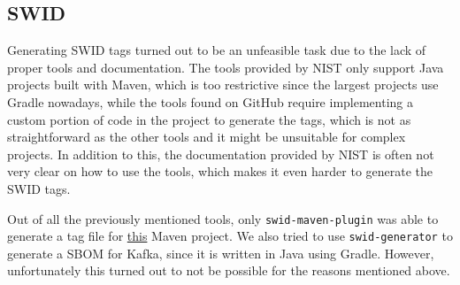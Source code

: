 \subsection{SWID} \label{results:swid}
Generating SWID tags turned out to be an unfeasible task due to the lack of proper tools and documentation. The tools provided by NIST only support Java projects built with Maven, which is too restrictive since the largest projects use Gradle nowadays, while the tools found on GitHub require implementing a custom portion of code in the project to generate the tags, which is not as straightforward as the other tools and it might be unsuitable for complex projects.
In addition to this, the documentation provided by NIST is often not very clear on how to use the tools, which makes it even harder to generate the SWID tags.

Out of all the previously mentioned tools, only \verb|swid-maven-plugin| was able to generate a tag file for \href{https://github.com/MithunTechnologiesDevOps/maven-web-application}{this} Maven project.
We also tried to use \verb|swid-generator| to generate a SBOM for Kafka, since it is written in Java using Gradle. However, unfortunately this turned out to not be possible for the reasons mentioned above.